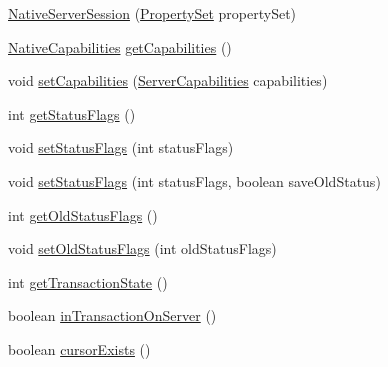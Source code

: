 \begin{DoxyCompactItemize}
\item 
\mbox{\hyperlink{classcom_1_1mysql_1_1cj_1_1protocol_1_1a_1_1_native_server_session_a6c5791574148df51d2ad36e22d21b58c}{Native\+Server\+Session}} (\mbox{\hyperlink{interfacecom_1_1mysql_1_1cj_1_1conf_1_1_property_set}{Property\+Set}} property\+Set)
\item 
\mbox{\hyperlink{classcom_1_1mysql_1_1cj_1_1protocol_1_1a_1_1_native_capabilities}{Native\+Capabilities}} \mbox{\hyperlink{classcom_1_1mysql_1_1cj_1_1protocol_1_1a_1_1_native_server_session_a482ab0553e0ed36382b3224cf302844e}{get\+Capabilities}} ()
\item 
void \mbox{\hyperlink{classcom_1_1mysql_1_1cj_1_1protocol_1_1a_1_1_native_server_session_a9fa5513f7f2e28921a9d5b3331591bd1}{set\+Capabilities}} (\mbox{\hyperlink{interfacecom_1_1mysql_1_1cj_1_1protocol_1_1_server_capabilities}{Server\+Capabilities}} capabilities)
\item 
int \mbox{\hyperlink{classcom_1_1mysql_1_1cj_1_1protocol_1_1a_1_1_native_server_session_a3b8393e68e3bba53f8afafeb67ea4616}{get\+Status\+Flags}} ()
\item 
void \mbox{\hyperlink{classcom_1_1mysql_1_1cj_1_1protocol_1_1a_1_1_native_server_session_ad533b5d433cde1b38176e2718308c7a4}{set\+Status\+Flags}} (int status\+Flags)
\item 
void \mbox{\hyperlink{classcom_1_1mysql_1_1cj_1_1protocol_1_1a_1_1_native_server_session_a22280140ed155d3eedb9ab2c9c636afe}{set\+Status\+Flags}} (int status\+Flags, boolean save\+Old\+Status)
\item 
int \mbox{\hyperlink{classcom_1_1mysql_1_1cj_1_1protocol_1_1a_1_1_native_server_session_a9d054f3066b6456e33a10c8ff57e439f}{get\+Old\+Status\+Flags}} ()
\item 
void \mbox{\hyperlink{classcom_1_1mysql_1_1cj_1_1protocol_1_1a_1_1_native_server_session_a1fc54902245f1c34539d27846fa5e211}{set\+Old\+Status\+Flags}} (int old\+Status\+Flags)
\item 
int \mbox{\hyperlink{classcom_1_1mysql_1_1cj_1_1protocol_1_1a_1_1_native_server_session_af4dfde9ca1e0cea7177b791ba4819f06}{get\+Transaction\+State}} ()
\item 
boolean \mbox{\hyperlink{classcom_1_1mysql_1_1cj_1_1protocol_1_1a_1_1_native_server_session_a8d5589f1a033854b5fb7bf4bd687af3f}{in\+Transaction\+On\+Server}} ()
\item 
boolean \mbox{\hyperlink{classcom_1_1mysql_1_1cj_1_1protocol_1_1a_1_1_native_server_session_a9e04d0827dc182b812bde510a82952c1}{cursor\+Exists}} ()

\end{DoxyCompactItemize}
